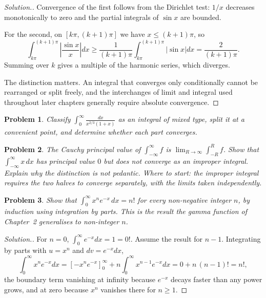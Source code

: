 \documentclass[12pt,a4paper]{report}
\theoremstyle{definition}
\theoremstyle{plain}
\newtheorem{problemx}{Problem}[section]
\newenvironment{problem}{\begin{problemx}}{\end{problemx}}
\newenvironment{solution}
  {\renewcommand{\qedsymbol}{}\begin{proof}[\textit{Solution}.]}
  {\end{proof}}
\begin{document}
\begin{solution}
Convergence of the first follows from the Dirichlet test: $1/x$ decreases
monotonically to zero and the partial integrals of $\sin x$ are bounded.

For the second, on $[k\pi,(k+1)\pi]$ we have $x\leq(k+1)\pi$, so
$$\int^{(k+1)\pi}_{k\pi}\left|\frac{\sin x}{x}\right|dx
\geq \frac{1}{(k+1)\pi}\int^{(k+1)\pi}_{k\pi}\left|\sin x\right|dx
= \frac{2}{(k+1)\pi}.$$
Summing over $k$ gives a multiple of the harmonic series, which diverges.

The distinction matters. An integral that converges only conditionally cannot
be rearranged or split freely, and the interchanges of limit and integral used
throughout later chapters generally require absolute convergence.
\end{solution}

\begin{problem}
Classify $\displaystyle\int^{\infty}_{0}\frac{dx}{x^{2/3}(1+x)}$ as an integral
of mixed type, split it at a convenient point, and determine whether each part
converges.
\end{problem}

\begin{problem}
The \emph{Cauchy principal value} of $\int^{\infty}_{-\infty}f$ is
$\lim_{R\to\infty}\int^{R}_{-R}f$. Show that
$\int^{\infty}_{-\infty}x\,dx$ has principal value $0$ but does not converge as
an improper integral. Explain why the distinction is not pedantic.
\emph{Where to start: the improper integral requires the two halves to converge
separately, with the limits taken independently.}
\end{problem}

\begin{problem}
Show that $\displaystyle\int^{\infty}_{0}x^{n}e^{-x}\,dx = n!$ for every
non-negative integer $n$, by induction using integration by parts. This is the
result the gamma function of Chapter~2 generalises to non-integer $n$.
\end{problem}

\begin{solution}
For $n=0$, $\int^{\infty}_{0}e^{-x}dx = 1 = 0!$. Assume the result for $n-1$.
Integrating by parts with $u=x^{n}$ and $dv=e^{-x}dx$,
$$\int^{\infty}_{0}x^{n}e^{-x}dx
= \left[-x^{n}e^{-x}\right]^{\infty}_{0}
+ n\int^{\infty}_{0}x^{n-1}e^{-x}dx = 0 + n\,(n-1)! = n!,$$
the boundary term vanishing at infinity because $e^{-x}$ decays faster than any
power grows, and at zero because $x^{n}$ vanishes there for $n\geq1$.
\end{solution}
\end{document}
